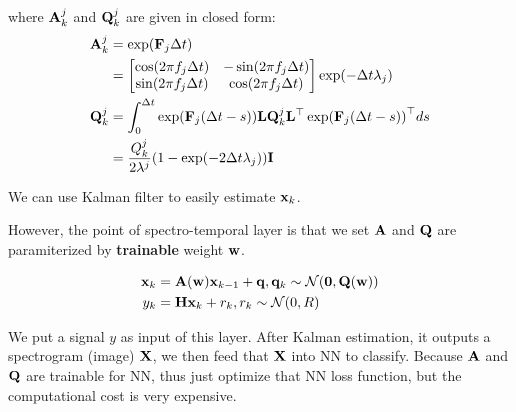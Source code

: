 \documentclass[11pt,a4paper]{article}
\begin{document}
where $\mathbf{A}^j_k$ and $\mathbf{Q}^j_k$ are given in closed form:
\begin{align}
\mathbf{A}^j_k &= \exp(\mathbf{F}_j\Delta t)\\
&= \begin{bmatrix}
\cos (2\pi f_j\Delta t) & -\sin (2\pi f_j\Delta t)\\
\sin (2\pi f_j\Delta t) & \cos (2\pi f_j\Delta t)
\end{bmatrix}\exp(-\Delta t \lambda_j)\\
\mathbf{Q}^j_k &= \int_0^{\Delta t} \exp(\mathbf{F}_j(\Delta t-s)) \mathbf{L}\mathbf{Q}^j_k\mathbf{L}^\top \exp(\mathbf{F}_j(\Delta t-s))^\top ds\\
&= \frac{Q^j_k}{2\lambda^j}(1 - \exp(-2\Delta t \lambda_j)) \mathbf{I}
\label{equ:osc-solve}
\end{align}

We can use Kalman filter to easily estimate $\mathbf{x}_k$. 

However, the point of spectro-temporal layer is that we set $\mathbf{A}$ and $\mathbf{Q}$ are paramiterized by \textbf{trainable} weight $\mathbf{w}$. 

\begin{equation}
\begin{split}
\cu{x}_k & = \cu{A}(\cu{w})\cu{x}_{k-1} + \cu{q}, \hfill \cu{q}_k\sim\mathcal{N}(\cu{0},\cu{Q}(\cu{w}))\\
y_k &= \cu{H}\cu{x}_k + r_k, \hfill r_k\sim\mathcal{N}(0, R)
\end{split}
\label{equ:osc-model}
\end{equation}

We put a signal $y$ as input of this layer. After Kalman estimation, it outputs a spectrogram (image) $\mathbf{X}$, we then feed that $\mathbf{X}$ into NN to classify. Because $\mathbf{A}$ and $\mathbf{Q}$ are trainable for NN, thus just optimize that NN loss function, but the computational cost is very expensive. 
\end{document}
